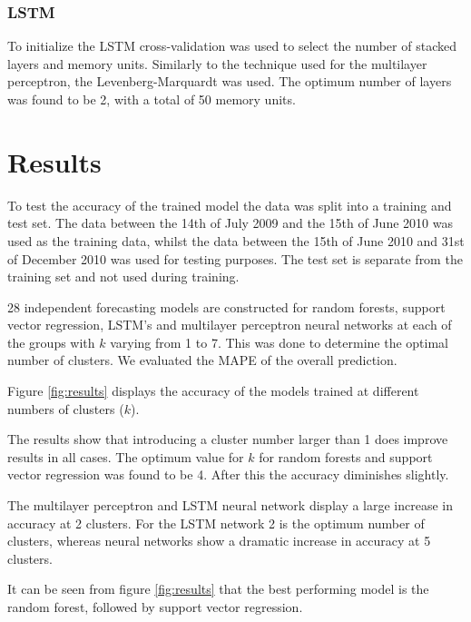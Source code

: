 \subsubsection{LSTM}

To initialize the LSTM cross-validation was used to select the number of stacked layers and memory units. Similarly to the technique used for the multilayer perceptron, the Levenberg-Marquardt was used. The optimum number of layers was found to be 2, with a total of 50 memory units.



\section{Results}

To test the accuracy of the trained model the data was split into a training and test set. The data between the 14th of July 2009 and the 15th of June 2010 was used as the training data, whilst the data between the 15th of June 2010 and 31st of December 2010 was used for testing purposes. The test set is separate from the training set and not used during training. 

28 independent forecasting models are constructed for random forests, support vector regression, LSTM's and multilayer perceptron neural networks at each of the groups with $k$ varying from 1 to 7. This was done to determine the optimal number of clusters. We evaluated the MAPE of the overall prediction. 

Figure \ref{fig:results} displays the accuracy of the models trained at different numbers of clusters ($k$). 

The results show that introducing a cluster number larger than 1 does improve results in all cases. The optimum value for $k$ for random forests and support vector regression was found to be 4. After this the accuracy diminishes slightly.

The multilayer perceptron and LSTM neural network display a large increase in accuracy at 2 clusters. For the LSTM network 2 is the optimum number of clusters, whereas neural networks show a dramatic increase in accuracy at 5 clusters.

It can be seen from figure \ref{fig:results} that the best performing model is the random forest, followed by support vector regression. 

